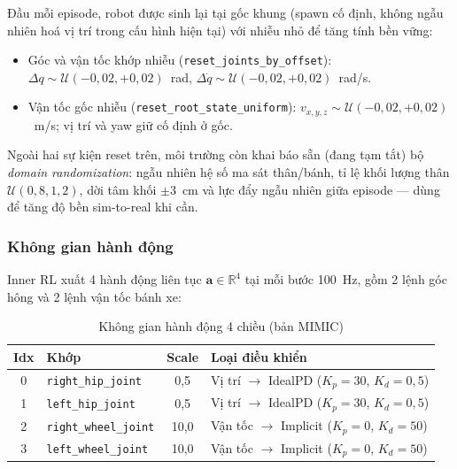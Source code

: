 Đầu mỗi episode, robot được sinh lại tại gốc khung (spawn cố định, không
ngẫu nhiên hoá vị trí trong cấu hình hiện tại) với nhiễu nhỏ để tăng tính
bền vững:
\begin{itemize}
    \item Góc và vận tốc khớp nhiễu (\texttt{reset\_joints\_by\_offset}):
    $\Delta q\sim\mathcal{U}(-0{,}02,+0{,}02)$~rad,
    $\Delta\dot{q}\sim\mathcal{U}(-0{,}02,+0{,}02)$~rad/s.
    \item Vận tốc gốc nhiễu (\texttt{reset\_root\_state\_uniform}):
    $v_{x,y,z}\sim\mathcal{U}(-0{,}02,+0{,}02)$~m/s; vị trí và yaw giữ cố
    định ở gốc.
\end{itemize}

Ngoài hai sự kiện reset trên, môi trường còn khai báo sẵn (đang tạm tắt) bộ
\textit{domain randomization}: ngẫu nhiên hệ số ma sát thân/bánh, tỉ lệ
khối lượng thân $\mathcal{U}(0{,}8,1{,}2)$, dời tâm khối $\pm3$~cm và lực
đẩy ngẫu nhiên giữa episode — dùng để tăng độ bền sim-to-real khi cần.

\subsubsection{Không gian hành động}
\label{sec:action_space}

Inner RL xuất 4 hành động liên tục $\mathbf{a}\in\mathbb{R}^4$ tại mỗi bước
100~Hz, gồm 2 lệnh góc hông và 2 lệnh vận tốc bánh xe:

\begin{table}[H]
    \centering
    \caption{Không gian hành động 4 chiều (bản MIMIC)}
    \label{tab:action_cfg}
    \renewcommand{\arraystretch}{1.3}
    \begin{tabular}{|c|l|c|l|}
    \hline
    \textbf{Idx} & \textbf{Khớp} & \textbf{Scale} & \textbf{Loại điều khiển} \\
    \hline
    0 & \texttt{right\_hip\_joint} & 0{,}5 & Vị trí $\to$ IdealPD ($K_p{=}30$, $K_d{=}0{,}5$) \\
    1 & \texttt{left\_hip\_joint}  & 0{,}5 & Vị trí $\to$ IdealPD ($K_p{=}30$, $K_d{=}0{,}5$) \\
    2 & \texttt{right\_wheel\_joint} & 10{,}0 & Vận tốc $\to$ Implicit ($K_p{=}0$, $K_d{=}50$) \\
    3 & \texttt{left\_wheel\_joint}  & 10{,}0 & Vận tốc $\to$ Implicit ($K_p{=}0$, $K_d{=}50$) \\
    \hline
    \end{tabular}
\end{table}

